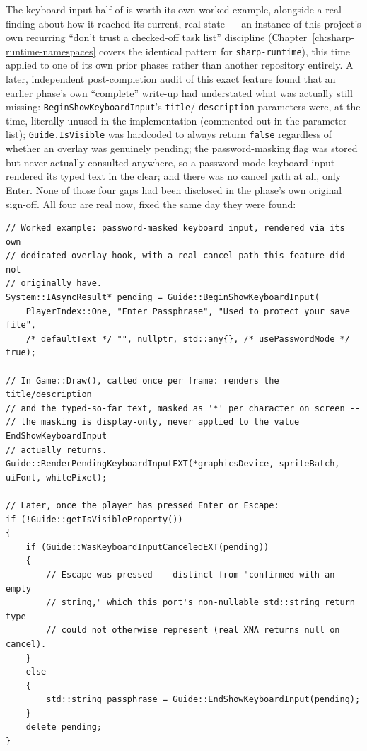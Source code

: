 The keyboard-input half of  is worth its own worked example, alongside a real
finding about how it reached its current, real state --- an instance of this project's own
recurring ``don't trust a checked-off task list'' discipline (Chapter~\ref{ch:sharp-runtime-namespaces}
covers the identical pattern for \texttt{sharp-runtime}), this time applied to one of its own
prior phases rather than another repository entirely. A later, independent post-completion audit
of this exact feature found that an earlier phase's own ``complete'' write-up had understated
what was actually still missing: \texttt{BeginShowKeyboardInput}'s \texttt{title}/%
\texttt{description} parameters were, at the time, literally unused in the implementation (commented
out in the parameter list); \texttt{Guide.IsVisible} was hardcoded to always return \texttt{false}
regardless of whether an overlay was genuinely pending; the password-masking flag was stored but
never actually consulted anywhere, so a password-mode keyboard input rendered its typed text in
the clear; and there was no cancel path at all, only Enter. None of those four gaps had been
disclosed in the phase's own original sign-off. All four are real now, fixed the same day they
were found:

\begin{lstlisting}
// Worked example: password-masked keyboard input, rendered via its own
// dedicated overlay hook, with a real cancel path this feature did not
// originally have.
System::IAsyncResult* pending = Guide::BeginShowKeyboardInput(
    PlayerIndex::One, "Enter Passphrase", "Used to protect your save file",
    /* defaultText */ "", nullptr, std::any{}, /* usePasswordMode */ true);

// In Game::Draw(), called once per frame: renders the title/description
// and the typed-so-far text, masked as '*' per character on screen --
// the masking is display-only, never applied to the value EndShowKeyboardInput
// actually returns.
Guide::RenderPendingKeyboardInputEXT(*graphicsDevice, spriteBatch, uiFont, whitePixel);

// Later, once the player has pressed Enter or Escape:
if (!Guide::getIsVisibleProperty())
{
    if (Guide::WasKeyboardInputCanceledEXT(pending))
    {
        // Escape was pressed -- distinct from "confirmed with an empty
        // string," which this port's non-nullable std::string return type
        // could not otherwise represent (real XNA returns null on cancel).
    }
    else
    {
        std::string passphrase = Guide::EndShowKeyboardInput(pending);
    }
    delete pending;
}
\end{lstlisting}

